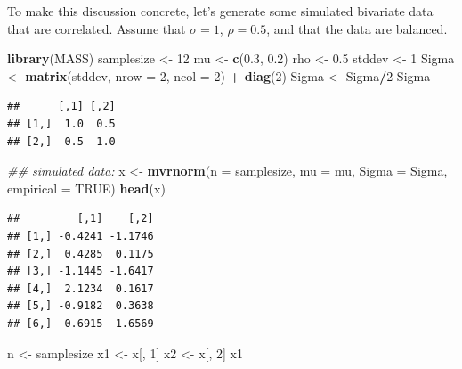 \documentclass[12pt,]{krantz}
\newenvironment{Shaded}{\begin{snugshade}}{\end{snugshade}}
\newcommand{\CommentTok}[1]{\textcolor[rgb]{0.56,0.35,0.01}{\textit{#1}}}
\newcommand{\DataTypeTok}[1]{\textcolor[rgb]{0.13,0.29,0.53}{#1}}
\newcommand{\DecValTok}[1]{\textcolor[rgb]{0.00,0.00,0.81}{#1}}
\newcommand{\FloatTok}[1]{\textcolor[rgb]{0.00,0.00,0.81}{#1}}
\newcommand{\KeywordTok}[1]{\textcolor[rgb]{0.13,0.29,0.53}{\textbf{#1}}}
\newcommand{\NormalTok}[1]{#1}
\newcommand{\OperatorTok}[1]{\textcolor[rgb]{0.81,0.36,0.00}{\textbf{#1}}}
\newcommand{\OtherTok}[1]{\textcolor[rgb]{0.56,0.35,0.01}{#1}}
\newcommand{\StringTok}[1]{\textcolor[rgb]{0.31,0.60,0.02}{#1}}
\begin{document}
To make this discussion concrete, let's generate some simulated bivariate data that are correlated. Assume that \(\sigma = 1\),
\(\rho=0.5\), and that the data are balanced.

\begin{Shaded}
\begin{Highlighting}[]
\KeywordTok{library}\NormalTok{(MASS)}
\NormalTok{samplesize <-}\StringTok{ }\DecValTok{12}
\NormalTok{mu <-}\StringTok{ }\KeywordTok{c}\NormalTok{(}\FloatTok{0.3}\NormalTok{, }\FloatTok{0.2}\NormalTok{)}
\NormalTok{rho <-}\StringTok{ }\FloatTok{0.5}
\NormalTok{stddev <-}\StringTok{ }\DecValTok{1}
\NormalTok{Sigma <-}\StringTok{ }\KeywordTok{matrix}\NormalTok{(stddev, }\DataTypeTok{nrow =} \DecValTok{2}\NormalTok{, }\DataTypeTok{ncol =} \DecValTok{2}\NormalTok{) }\OperatorTok{+}\StringTok{ }\KeywordTok{diag}\NormalTok{(}\DecValTok{2}\NormalTok{)}
\NormalTok{Sigma <-}\StringTok{ }\NormalTok{Sigma}\OperatorTok{/}\DecValTok{2}
\NormalTok{Sigma}
\end{Highlighting}
\end{Shaded}

\begin{verbatim}
##      [,1] [,2]
## [1,]  1.0  0.5
## [2,]  0.5  1.0
\end{verbatim}

\begin{Shaded}
\begin{Highlighting}[]
\CommentTok{## simulated data:}
\NormalTok{x <-}\StringTok{ }\KeywordTok{mvrnorm}\NormalTok{(}\DataTypeTok{n =}\NormalTok{ samplesize, }\DataTypeTok{mu =}\NormalTok{ mu, }\DataTypeTok{Sigma =}\NormalTok{ Sigma, }
  \DataTypeTok{empirical =} \OtherTok{TRUE}\NormalTok{)}
\KeywordTok{head}\NormalTok{(x)}
\end{Highlighting}
\end{Shaded}

\begin{verbatim}
##         [,1]    [,2]
## [1,] -0.4241 -1.1746
## [2,]  0.4285  0.1175
## [3,] -1.1445 -1.6417
## [4,]  2.1234  0.1617
## [5,] -0.9182  0.3638
## [6,]  0.6915  1.6569
\end{verbatim}

\begin{Shaded}
\begin{Highlighting}[]
\NormalTok{n <-}\StringTok{ }\NormalTok{samplesize}
\NormalTok{x1 <-}\StringTok{ }\NormalTok{x[, }\DecValTok{1}\NormalTok{]}
\NormalTok{x2 <-}\StringTok{ }\NormalTok{x[, }\DecValTok{2}\NormalTok{]}
\NormalTok{x1}
\end{Highlighting}
\end{Shaded}
\end{document}
